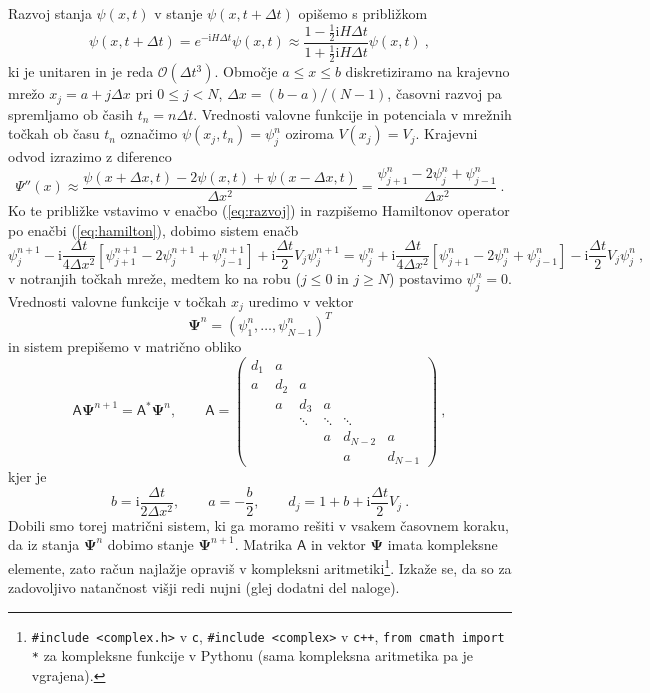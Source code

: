 \documentclass[slovene,11pt,a4paper]{article}
\newcommand{\ii}{\mathrm{i}}
\newcommand{\thalf}{\tfrac{1}{2}}
\begin{document}
Razvoj stanja $\psi(x,t)$ v stanje $\psi(x,t+\Delta t)$ opišemo s približkom
\begin{equation}
  \psi(x,t+\Delta t)=e^{-\ii H \Delta t} \psi(x,t)\approx \frac{1-\thalf \ii H \Delta t}{1+\thalf \ii H \Delta t}\psi(x,t)\>,
  \label{eq:razvoj}
\end{equation}
ki je unitaren in je reda $\mathcal{O}(\Delta t^3)$. Območje $a\leq x\leq b$ diskretiziramo na krajevno mrežo $x_j=a+j\Delta x$ pri $0\leq j<N$, $\Delta x = (b-a)/(N-1)$, časovni razvoj pa spremljamo ob časih $t_n=n\Delta t$. Vrednosti valovne funkcije in potenciala v mrežnih točkah ob času $t_n$ označimo $\psi(x_j,t_n)=\psi_j^n$ oziroma $V(x_j)=V_j$. Krajevni odvod izrazimo z diferenco
\begin{equation*}
  \Psi''(x)\approx \frac{\psi(x+\Delta x,t)-2\psi(x,t)+\psi(x-\Delta x,t)}{\Delta x^2}=\frac{\psi_{j+1}^n - 2\psi_j^n+\psi_{j-1}^n}{\Delta x^2}\>.
\end{equation*}
Ko te približke vstavimo v enačbo (\ref{eq:razvoj}) in razpišemo Hamiltonov operator po enačbi (\ref{eq:hamilton}), dobimo sistem enačb
\begin{equation*}
  \psi_j^{n+1}-\ii\frac{\Delta t}{4\Delta x^2}\left[\psi_{j+1}^{n+1}-2\psi_j^{n+1}+\psi_{j-1}^{n+1}\right] + \ii\frac{\Delta t}{2}V_j \psi_j^{n+1}=  \psi_j^{n}+\ii\frac{\Delta t}{4\Delta x^2}\left[\psi_{j+1}^{n}-2\psi_j^{n}+\psi_{j-1}^{n}\right] - \ii\frac{\Delta t}{2}V_j \psi_j^{n}\>,
\end{equation*}
v notranjih točkah mreže, medtem ko na robu ($j\leq 0$ in $j\geq N$) postavimo $\psi_j^n=0$. Vrednosti valovne funkcije v točkah $x_j$ uredimo v vektor
\begin{equation*}
\boldsymbol{\Psi}^n=(\psi_1^n,\ldots,\psi_{N-1}^n)^T
\end{equation*}
in sistem prepišemo v matrično obliko
\begin{equation*}
  \mathsf{A}\boldsymbol{\Psi}^{n+1}=\mathsf{A}^\ast \boldsymbol{\Psi}^n,\qquad
  \mathsf{A}=\begin{pmatrix}
  d_1 & a \\
  a   & d_2 & a \\
  & a & d_3 & a \\
  & & \ddots & \ddots & \ddots \\
  & & & a & d_{N-2} & a \\
  & & & & a & d_{N-1}
  \end{pmatrix}\>,
\end{equation*}
kjer je
\begin{equation*}
  b=\ii \frac{\Delta t}{2 \Delta x^2},\qquad a=-\frac{b}{2},\qquad d_j = 1+b+\ii \frac{\Delta t}{2}V_j\>.
\end{equation*}
Dobili smo torej matrični sistem, ki ga moramo rešiti v vsakem časovnem koraku, da iz stanja $\boldsymbol{\Psi}^n$ dobimo stanje $\boldsymbol{\Psi}^{n+1}$. Matrika $\mathsf{A}$ in vektor $\boldsymbol{\Psi}$ imata kompleksne elemente, zato račun najlažje opraviš v kompleksni aritmetiki\footnote{
  {\tt \#include <complex.h>} v {\tt c}, {\tt \#include <complex>} v {\tt c++}, {\tt from cmath import *} za kompleksne funkcije v Pythonu (sama kompleksna aritmetika pa je vgrajena).
}. Izkaže se, da so za zadovoljivo natančnost višji redi nujni (glej dodatni del naloge).
\end{document}
